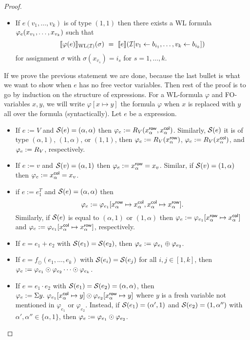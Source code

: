 \begin{proof}
\begin{itemize}
	\item If $e(v_1,\ldots,v_k)$ is of type $(1,1)$ then there exists a WL formula $\varphi_e( x_{v_1}, \ldots, x_{v_k})$ such that
	$$
	\ssem{\varphi(e)}{\text{WL}(\I)}(\sigma) \ = \ \sem{e}{\I[v_1\gets b_{i_1},\ldots,v_k\gets b_{i_k}]}
	$$
	for assignment $\sigma$ with $\sigma(x_{v_s})=i_s$ for $s=1,\ldots, k$.
\end{itemize}
If we prove the previous statement we are done, because the last bullet is what we want to show when $e$ has no free vector variables. 
Then rest of the proof is to go by induction on the structure of \langprod expressions.
For a WL-formula $\varphi$ and FO-variables $x,y$, we will write  $\varphi[x \mapsto y]$ the formula $\varphi$ when $x$ is replaced with $y$ all over the formula (syntactically).
Let $e$ be a \langprod expression.
\begin{itemize} \itemsep3mm
  \item If $e:=V$ and $\mathcal{S}(e)= (\alpha, \alpha)$ then $\varphi_e:=R_V(x_{\alpha}^{\mathsf{row}}, x_{\alpha}^{\mathsf{col}})$. Similarly, $\mathcal{S}(e)$ it is of type $(\alpha,1)$, $(1, \alpha)$, or $(1,1)$, then $\varphi_e:=R_V(x_{\alpha}^{\mathsf{row}})$, $\varphi_e:=R_V(x_{\alpha}^{\mathsf{col}})$, and $\varphi_e:=R_V$, respectively.
  
  \item If $e:=v$ and $\mathcal{S}(v)= (\alpha,1)$ then $\varphi_e := x_{\alpha}^{\mathsf{row}} = x_v$. Similar, if $\mathcal{S}(v)= (1,\alpha)$ then $\varphi_e := x_{\alpha}^{\mathsf{col}} = x_v$.
  
  \item if $e:= e_1^T$ and $\mathcal{S}(e)=(\alpha,\alpha)$ then
  $$
  \varphi_e:= \varphi_{e_1}[x_{\alpha}^{\mathsf{row}} \mapsto x_{\alpha}^{\mathsf{col}}, x_{\alpha}^{\mathsf{col}} \mapsto x_{\alpha}^{\mathsf{row}}].
  $$
  Similarly, if $\mathcal{S}(e)$ is equal to $(\alpha,1)$ or $(1,\alpha)$ then $\varphi_e:=\varphi_{e_1}[x_{\alpha}^{\mathsf{row}} \mapsto x_{\alpha}^{\mathsf{col}}]$ and $\varphi_e:=\varphi_{e_1}[x_{\alpha}^{\mathsf{col}} \mapsto x_{\alpha}^{\mathsf{row}}]$, respectively.   


	\item If $e=e_1+e_2$ with $\mathcal{S} (e_1)=\mathcal{S} (e_2)$, then $\varphi_e:= \varphi_{e_1} \oplus \varphi_{e_2}$.
	
	\item If $e=f_\odot(e_1,\ldots, e_k)$ with $\mathcal{S}(e_i)=\mathcal{S}(e_j)$ for all $i,j\in[1,k]$, then $\varphi_e:= \varphi_{e_1} \odot \varphi_{e_2} \cdots \odot \varphi_{e_k}$.
	
	\item If $e=e_1\cdot e_2$ with $\mathcal{S} (e_1)=\mathcal{S} (e_2)=(\alpha, \alpha)$,  then $\varphi_e:= \Sigma y. \  \varphi_{e_1}[x_{\alpha}^{\mathsf{col}} \mapsto y] \odot \varphi_{e_2}[x_{\alpha}^{\mathsf{row}} \mapsto y]$ where $y$ is a fresh variable not mentioned in $\varphi_{e_1}$ or $\varphi_{e_2}$. Instead, if $\mathcal{S} (e_1)= (\alpha', 1)$ and $\mathcal{S} (e_2)=(1, \alpha'')$ with $\alpha', \alpha'' \in \{\alpha, 1\}$, then $\varphi_e := \varphi_{e_1} \odot \varphi_{e_2}$.
	

\end{itemize}
\end{proof}
